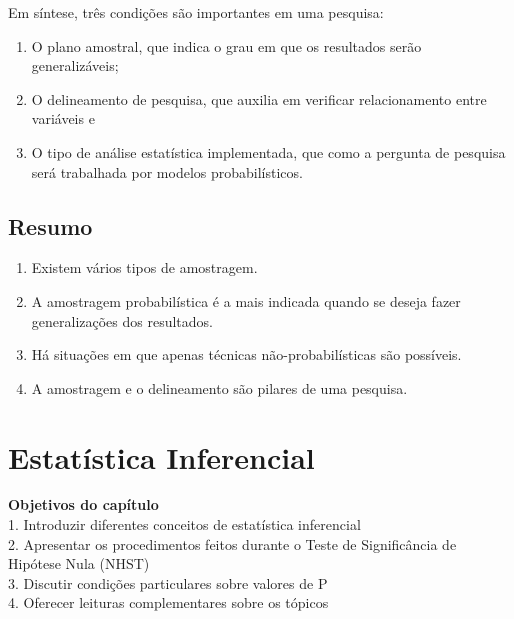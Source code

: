 \documentclass[
]{book}
\providecommand{\tightlist}{%
  \setlength{\itemsep}{0pt}\setlength{\parskip}{0pt}}
\newenvironment{objectives}{
  \definecolor{shadecolor}{rgb}{0.764,0.992,0.686}  %
  \color{black}
  \begin{shaded}}
 {\end{shaded}}
\begin{document}
Em síntese, três condições são importantes em uma pesquisa:

\begin{enumerate}
\def\labelenumi{(\arabic{enumi})}
\tightlist
\item
  O plano amostral, que indica o grau em que os resultados serão generalizáveis;
\item
  O delineamento de pesquisa, que auxilia em verificar relacionamento entre variáveis e\\
\item
  O tipo de análise estatística implementada, que como a pergunta de pesquisa será trabalhada por modelos probabilísticos.
\end{enumerate}

\hypertarget{resumo-4}{%
\section{Resumo}\label{resumo-4}}

\begin{enumerate}
\def\labelenumi{\arabic{enumi}.}
\tightlist
\item
  Existem vários tipos de amostragem.\\
\item
  A amostragem probabilística é a mais indicada quando se deseja fazer generalizações dos resultados.\\
\item
  Há situações em que apenas técnicas não-probabilísticas são possíveis.\\
\item
  A amostragem e o delineamento são pilares de uma pesquisa.\\
\end{enumerate}

\hypertarget{estatuxedstica-inferencial}{%
\chapter{Estatística Inferencial}\label{estatuxedstica-inferencial}}

\begin{objectives}
\textbf{Objetivos do capítulo}\\
1. Introduzir diferentes conceitos de estatística inferencial\\
2. Apresentar os procedimentos feitos durante o Teste de Significância de Hipótese Nula (NHST)\\
3. Discutir condições particulares sobre valores de P\\
4. Oferecer leituras complementares sobre os tópicos

\end{objectives}
\end{document}
